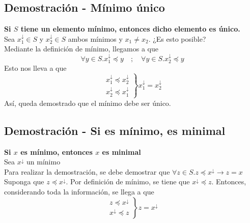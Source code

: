 \documentclass[../main.tex]{subfiles}
\begin{document}
\subsection{Demostración - Mínimo único}
\label{sec:dem_min_unico}
\textbf{Si $S$ tiene un elemento mínimo, entonces dicho elemento es único.}\\
Sea $x_1^{\downarrow} \in S$ y $x_2^{\downarrow} \in S$ ambos mínimos y $x_1 \not= x_2$. ¿Es esto posible?\\
Mediante la definición de mínimo, llegamos a que
\[ \forall y \in S . x_1^{\downarrow} \preceq y \quad ; \quad \forall y \in S . x_2^{\downarrow} \preceq y \]
Esto nos lleva a que
\[
    \left.
        \begin{array}{c}
            x_1^{\downarrow} \preceq x_2^{\downarrow}\\
            x_2^{\downarrow} \preceq x_1^{\downarrow}
        \end{array}
    \right \}
    x_1^{\downarrow} = x_2^{\downarrow}
\]
Así, queda demostrado que el mínimo debe ser único.

\subsection{Demostración - Si es mínimo, es minimal}
\label{sec:dem_min_minimal}
\textbf{Si $x$ es mínimo, entonces $x$ es minimal}\\
Sea $x^{\downarrow}$ un mínimo\\
Para realizar la demostración, se debe demostrar que $\forall z \in S . z \preceq x^{\downarrow} \rightarrow z = x$\\
Suponga que $z \preceq x^{\downarrow}$. Por definición de mínimo, se tiene que $x^{\downarrow} \preceq z$. Entonces, considerando toda la información, se llega a que
\[
    \left.
        \begin{array}{c}
            z \preceq x^{\downarrow}\\
            x^{\downarrow} \preceq z
        \end{array}
    \right \}
    z = x^{\downarrow}
\]
\end{document}

